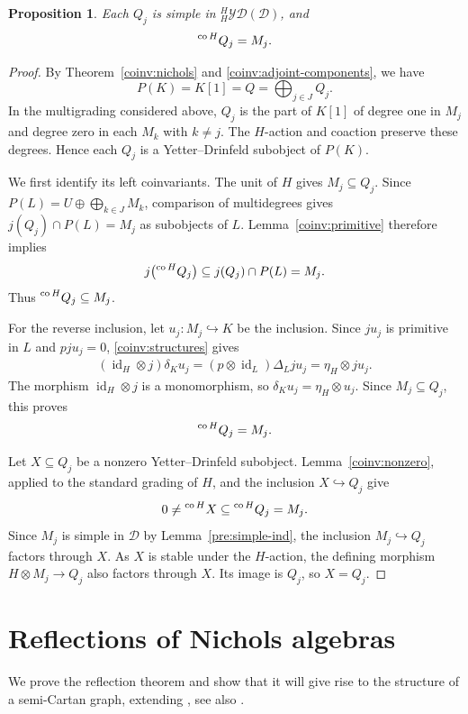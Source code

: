 \documentclass[11pt, a4paper]{article}
\numberwithin{equation}{section}
\newcommand{\D}{\mathcal D}
\newcommand{\YD}{\mathcal{YD}}
\DeclareMathOperator{\id}{id}
\DeclareMathOperator{\co}{co}
\newtheorem{proposition}[theorem]{Proposition}
\begin{document}
\begin{proposition}\label{coinv:simple}
Each $Q_j$ is simple in ${}_H^H\YD(\D)$, and
\[
 \prescript{\co H}{}{Q_j}=M_j.
\]
\end{proposition}

\begin{proof}
By Theorem~\ref{coinv:nichols} and
\eqref{coinv:adjoint-components}, we have
\[
 P(K)=K[1]=Q=\bigoplus_{j\in J}Q_j.
\]
In the multigrading considered above, $Q_j$ is the part
of $K[1]$ of degree one in $M_j$ and degree zero in
each $M_k$ with $k\neq j$.
The $H$-action and coaction preserve these degrees.
Hence each $Q_j$ is a Yetter--Drinfeld subobject of $P(K)$.

We first identify its left coinvariants.
The unit of $H$ gives $M_j\subseteq Q_j$.
Since $P(L)=U\oplus\bigoplus_{k\in J}M_k$, comparison
of multidegrees gives
$
 j(Q_j)\cap P(L)=M_j
$
as subobjects of $L$.
Lemma~\ref{coinv:primitive} therefore implies
\[
 j\bigl(\prescript{\co H}{}{Q_j}\bigr)
 \subseteq j(Q_j)\cap P(L)=M_j.
\]
Thus $\prescript{\co H}{}{Q_j}\subseteq M_j$.

For the reverse inclusion, let $u_j:M_j\hookrightarrow K$
be the inclusion.
Since $ju_j$ is primitive in $L$ and $pju_j=0$,
\eqref{coinv:structures} gives
\[
 \begin{aligned}
 (\id_H\otimes j)\delta_Ku_j
 =(p\otimes\id_L)\Delta_Lju_j
 =\eta_H\otimes ju_j.
 \end{aligned}
\]
The morphism $\id_H\otimes j$ is a monomorphism,
so $\delta_Ku_j=\eta_H\otimes u_j$.
Since $M_j\subseteq Q_j$, this proves
\[
 \prescript{\co H}{}{Q_j}=M_j.
\]

Let $X\subseteq Q_j$ be a nonzero Yetter--Drinfeld subobject.
Lemma~\ref{coinv:nonzero}, applied to the standard grading of $H$,
and the inclusion $X\hookrightarrow Q_j$ give
\[
 0\neq\prescript{\co H}{}{X}
 \subseteq\prescript{\co H}{}{Q_j}=M_j.
\]
Since $M_j$ is simple in $\D$ by
Lemma~\ref{pre:simple-ind}, the inclusion
$M_j\hookrightarrow Q_j$ factors through $X$.
As $X$ is stable under the $H$-action, the defining morphism
$H\otimes M_j\to Q_j$ also factors through $X$.
Its image is $Q_j$, so $X=Q_j$.
\end{proof}


\section{Reflections of Nichols algebras}\label{sec:reflection}

We prove the reflection theorem and show that it will give rise to the structure of a semi-Cartan graph, extending
\cite{reflection2}, see also \cite{HSdualpair,rootsys}.
\end{document}
